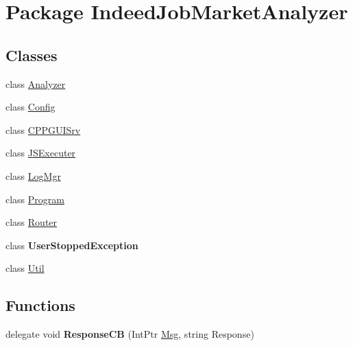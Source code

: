 \hypertarget{namespace_indeed_job_market_analyzer}{}\section{Package Indeed\+Job\+Market\+Analyzer}
\label{namespace_indeed_job_market_analyzer}
\subsection*{Classes}
\begin{DoxyCompactItemize}
\item 
class \hyperlink{class_indeed_job_market_analyzer_1_1_analyzer}{Analyzer}
\item 
class \hyperlink{class_indeed_job_market_analyzer_1_1_config}{Config}
\item 
class \hyperlink{class_indeed_job_market_analyzer_1_1_c_p_p_g_u_i_srv}{C\+P\+P\+G\+U\+I\+Srv}
\item 
class \hyperlink{class_indeed_job_market_analyzer_1_1_j_s_executer}{J\+S\+Executer}
\item 
class \hyperlink{class_indeed_job_market_analyzer_1_1_log_mgr}{Log\+Mgr}
\item 
class \hyperlink{class_indeed_job_market_analyzer_1_1_program}{Program}
\item 
class \hyperlink{class_indeed_job_market_analyzer_1_1_router}{Router}
\item 
class {\bfseries User\+Stopped\+Exception}
\item 
class \hyperlink{class_indeed_job_market_analyzer_1_1_util}{Util}
\end{DoxyCompactItemize}
\subsection*{Functions}
\begin{DoxyCompactItemize}
\item 
\hypertarget{namespace_indeed_job_market_analyzer_aaa671471c323f9b669fd00103d77ea86}{}delegate void {\bfseries Response\+C\+B} (Int\+Ptr \hyperlink{class_msg}{Msg}, string Response)\label{namespace_indeed_job_market_analyzer_aaa671471c323f9b669fd00103d77ea86}

\end{DoxyCompactItemize}

